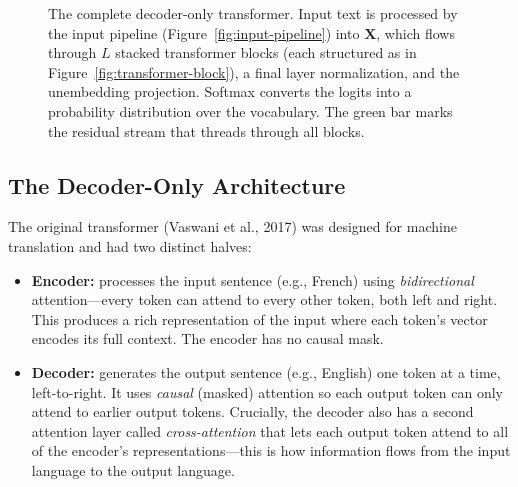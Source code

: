 \begin{figure}[ht]
\caption{The complete decoder-only transformer. Input text is processed by the input pipeline (Figure~\ref{fig:input-pipeline}) into $\mathbf{X}$, which flows through $L$ stacked transformer blocks (each structured as in Figure~\ref{fig:transformer-block}), a final layer normalization, and the unembedding projection. Softmax converts the logits into a probability distribution over the vocabulary. The green bar marks the residual stream that threads through all blocks.}
\label{fig:full-model}
\end{figure}

\subsection{The Decoder-Only Architecture}
\label{sec:decoder-only}

The original transformer (Vaswani et al., 2017) was designed for machine translation and had two distinct halves:
\begin{itemize}
    \item \textbf{Encoder:} processes the input sentence (e.g., French) using \emph{bidirectional} attention---every token can attend to every other token, both left and right. This produces a rich representation of the input where each token's vector encodes its full context. The encoder has no causal mask.
    \item \textbf{Decoder:} generates the output sentence (e.g., English) one token at a time, left-to-right. It uses \emph{causal} (masked) attention so each output token can only attend to earlier output tokens. Crucially, the decoder also has a second attention layer called \emph{cross-attention} that lets each output token attend to all of the encoder's representations---this is how information flows from the input language to the output language.
\end{itemize}

